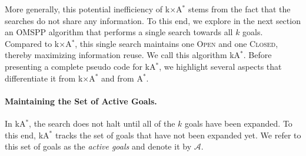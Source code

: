 \documentclass[smallextended]{svjour3}       %
\newcommand{\omspp}{\ac{OMSPP}\xspace}
\newcommand{\astar}{A$^*$\xspace}
\newcommand{\kastar}{kA$^*$\xspace}
\newcommand{\kxastar}{k$\times$A$^*$\xspace}
\newcommand{\open}{\textsc{Open}\xspace}
\newcommand{\closed}{\textsc{Closed}\xspace}
\newcommand{\activeg}{\mathcal{A}}
\begin{document}
More generally, this potential inefficiency of \kxastar stems from the fact that the searches do not share any information. To this end, we explore in the next section an \omspp algorithm that performs a single search towards all $k$ goals. Compared to \kxastar, this single search maintains one  \open and one \closed, thereby maximizing information reuse. We call this algorithm \kastar. Before presenting a complete pseudo code for \kastar, we highlight several aspects that differentiate it from \kxastar and from \astar.

\paragraph{Maintaining the Set of Active Goals.}
In \kastar, the search does not halt until all of the $k$ goals have been expanded. 
To this end, \kastar tracks the set of goals that have not been expanded yet. We refer to this set of goals as the \emph{active goals} and denote it by $\activeg$.

\end{document}
